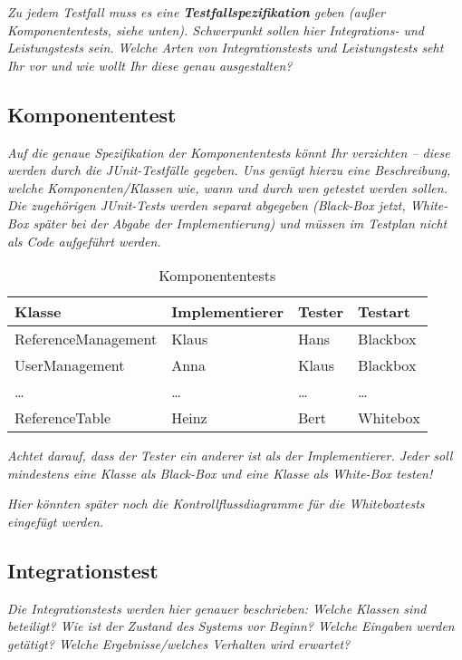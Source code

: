 \documentclass[fontsize=12pt,paper=a4,twoside]{scrartcl}
\begin{document}
{\em Zu jedem Testfall muss es eine {\bf Testfallspezifikation}
  geben (außer Komponententests, siehe unten). Schwerpunkt sollen
  hier Integrations- und Leistungstests sein. Welche Arten von
  Integrationstests und Leistungstests seht Ihr vor und wie wollt Ihr
  diese genau ausgestalten?}

\subsection{Komponententest}\label{c10-0}

{\em Auf die genaue Spezifikation der Komponententests könnt Ihr
  verzichten -- diese werden durch die JUnit-Testfälle gegeben. Uns
  genügt hierzu eine Beschreibung, welche Komponenten/Klassen wie,
  wann und durch wen getestet werden sollen. Die zugehörigen
  JUnit-Tests werden separat abgegeben (Black-Box jetzt, White-Box
  später bei der Abgabe der Implementierung) und müssen im Testplan
  nicht als Code aufgeführt werden.}

\begin{table}[h]
\centering
\begin{tabular}{|l|p{3cm}|p{3cm}|l|}
\hline
Klasse & Implementierer & Tester & Testart \\
\hline
ReferenceManagement & Klaus  & Hans    & Blackbox \\
UserManagement      & Anna   & Klaus   & Blackbox \\
\dots               & \dots  & \dots   & \dots \\
ReferenceTable      & Heinz  & Bert    & Whitebox \\
\hline
\end{tabular}
\caption{Komponententests}
\label{tab:komponententests}
\end{table}

{\em Achtet darauf, dass der Tester ein anderer ist als der
  Implementierer. Jeder soll mindestens eine Klasse als Black-Box und
  eine Klasse als White-Box testen!}

{\em Hier könnten später noch die Kontrollflussdiagramme für die
  Whiteboxtests eingefügt werden.}

\clearpage
\subsection{Integrationstest}\label{c10a}

{\em Die Integrationstests werden hier genauer beschrieben: Welche
  Klassen sind beteiligt? Wie ist der Zustand des Systems vor Beginn?
  Welche Eingaben werden getätigt? Welche Ergebnisse/welches Verhalten
  wird erwartet?}
\end{document}
